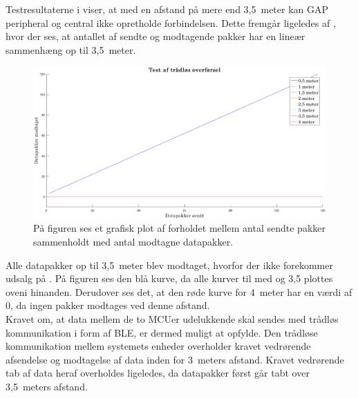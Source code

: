 Testresultaterne i  viser, at med en afstand på mere end 3,5~meter kan GAP peripheral og central ikke opretholde forbindelsen. Dette fremgår ligeledes af , hvor der ses, at antallet af sendte og modtagende pakker har en lineær sammenhæng op til 3,5~meter.
\begin{figure}[H]
	\centering
	\includegraphics[scale=0.35]{figures/cDesign/test_ble.png}
	\caption{På figuren ses et grafisk plot af forholdet mellem antal sendte pakker sammenholdt med antal modtagne datapakker. }
	\label{fig:test_ble}
\end{figure}\vspace{-.25cm}
Alle datapakker op til 3,5~meter blev modtaget, hvorfor der ikke forekommer udsalg på . På figuren ses den blå kurve, da alle kurver til med og 3,5 plottes oveni hinanden. Derudover ses det, at den røde kurve for 4~meter har en værdi af 0, da ingen pakker modtages ved denne afstand. \\
Kravet om, at data mellem de to MCUer udelukkende skal sendes med trådløs kommunikation i form af BLE, er dermed muligt at opfylde. Den trådløse kommunikation mellem systemets enheder overholder kravet vedrørende afsendelse og modtagelse af data inden for 3~meters afstand. Kravet vedrørende tab af data heraf overholdes ligeledes, da datapakker først går tabt over 3,5~meters afstand.
